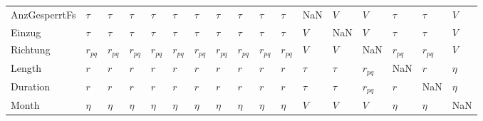\begin{tabular}{lllllllllllllllll}
AnzGesperrtFs &    $\tau$ &    $\tau$ &    $\tau$ &    $\tau$ &    $\tau$ &    $\tau$ &    $\tau$ &    $\tau$ &    $\tau$ &    $\tau$ &           NaN &     $V$ &       $V$ &    $\tau$ &    $\tau$ &     $V$ \\
Einzug        &    $\tau$ &    $\tau$ &    $\tau$ &    $\tau$ &    $\tau$ &    $\tau$ &    $\tau$ &    $\tau$ &    $\tau$ &    $\tau$ &           $V$ &     NaN &       $V$ &    $\tau$ &    $\tau$ &     $V$ \\
Richtung      &  $r_{pq}$ &  $r_{pq}$ &  $r_{pq}$ &  $r_{pq}$ &  $r_{pq}$ &  $r_{pq}$ &  $r_{pq}$ &  $r_{pq}$ &  $r_{pq}$ &  $r_{pq}$ &           $V$ &     $V$ &       NaN &  $r_{pq}$ &  $r_{pq}$ &     $V$ \\
Length        &       $r$ &       $r$ &       $r$ &       $r$ &       $r$ &       $r$ &       $r$ &       $r$ &       $r$ &       $r$ &        $\tau$ &  $\tau$ &  $r_{pq}$ &       NaN &       $r$ &  $\eta$ \\
Duration      &       $r$ &       $r$ &       $r$ &       $r$ &       $r$ &       $r$ &       $r$ &       $r$ &       $r$ &       $r$ &        $\tau$ &  $\tau$ &  $r_{pq}$ &       $r$ &       NaN &  $\eta$ \\
Month         &    $\eta$ &    $\eta$ &    $\eta$ &    $\eta$ &    $\eta$ &    $\eta$ &    $\eta$ &    $\eta$ &    $\eta$ &    $\eta$ &           $V$ &     $V$ &       $V$ &    $\eta$ &    $\eta$ &     NaN \\
\bottomrule
\end{tabular}
